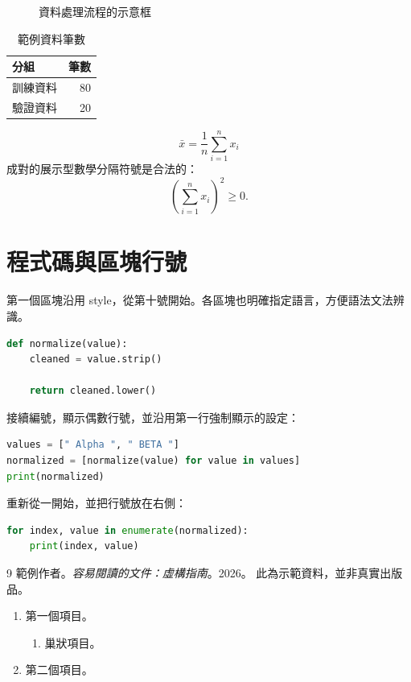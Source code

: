 \documentclass[UTF8,fontset=none,11pt]{ctexrep}
\begin{document}
\begin{figure}[htbp]
  \centering
  \fbox{\rule{0pt}{18mm}\rule{0.65\linewidth}{0pt}}
  \caption{資料處理流程的示意框}
  \label{fig:flow}
\end{figure}
\begin{table}[htbp]
  \centering
  \caption{範例資料筆數}
  \label{tab:counts}
  \begin{tabular}{lr}
    分組 & 筆數 \\
    \hline
    訓練資料 & 80 \\
    驗證資料 & 20 \\
  \end{tabular}
\end{table}
\begin{equation}
  \bar{x} = \frac{1}{n}\sum_{i=1}^{n}x_i
  \label{eq:mean}
\end{equation}
成對的展示型數學分隔符號是合法的：
\[
  \left(\sum_{i=1}^{n}x_i\right)^2 \geq 0.
\]

\section{程式碼與區塊行號}
\label{sec:code}
第一個區塊沿用 style，從第十號開始。各區塊也明確指定語言，方便語法文法辨識。
\begin{lstlisting}[language=Python,firstnumber=10]
def normalize(value):
    cleaned = value.strip()

    return cleaned.lower()
\end{lstlisting}
接續編號，顯示偶數行號，並沿用第一行強制顯示的設定：
\begin{lstlisting}[language=Python,firstnumber=last,stepnumber=2]
values = [" Alpha ", " BETA "]
normalized = [normalize(value) for value in values]
print(normalized)
\end{lstlisting}
重新從一開始，並把行號放在右側：
\begin{lstlisting}[language=Python,numbers=right,firstnumber=1]
for index, value in enumerate(normalized):
    print(index, value)
\end{lstlisting}

\begin{thebibliography}{9}
  範例作者。\emph{容易閱讀的文件：虛構指南}。2026。
  此為示範資料，並非真實出版品。
\end{thebibliography}

\begin{enumerate}
  \item 第一個項目。\label{item:first}
  \begin{enumerate}
    \item 巢狀項目。
  \end{enumerate}
  \item 第二個項目。
\end{enumerate}
\end{document}
